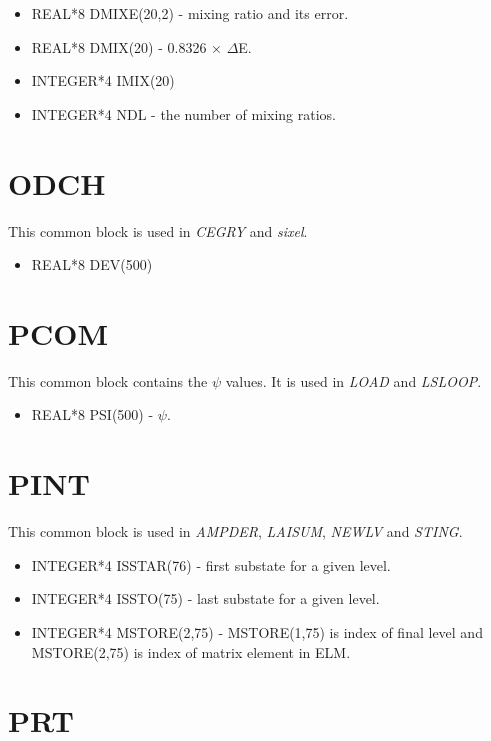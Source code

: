 \begin{itemize}
\item REAL*8 DMIXE(20,2) - mixing ratio and its error.
\item REAL*8 DMIX(20) - 0.8326 $\times$ $\Delta$E.
\item INTEGER*4 IMIX(20)
\item INTEGER*4 NDL - the number of mixing ratios.
\end{itemize}

\section{ODCH}

This common block is used in {\em CEGRY} and {\em sixel}.

\begin{itemize}
\item REAL*8 DEV(500)
\end{itemize}

\section{PCOM}

This common block contains the $\psi$ values. It is used in {\em LOAD} and
{\em LSLOOP}.

\begin{itemize}
\item REAL*8 PSI(500) - $\psi$.
\end{itemize}

\section{PINT}

This common block is used in {\em AMPDER}, {\em LAISUM}, {\em NEWLV} and
{\em STING}.

\begin{itemize}
\item INTEGER*4 ISSTAR(76) - first substate for a given level.
\item INTEGER*4 ISSTO(75) - last substate for a given level.
\item INTEGER*4 MSTORE(2,75) - MSTORE(1,75) is index of final level and
MSTORE(2,75) is index of matrix element in ELM.
\end{itemize}

\section{PRT}


